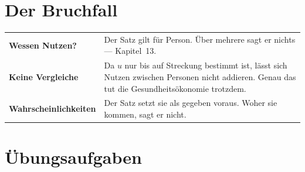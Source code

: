 \section{Der Bruchfall}

\begin{warnung}
\begin{center}
{\small
\renewcommand{\arraystretch}{1.52}
\begin{tabular}{@{}P{3.0cm}P{5.6cm}@{}}
\toprule
\textbf{Wessen Nutzen?} & Der Satz gilt für  Person. Über mehrere sagt er nichts --- Kapitel~13.\\
\textbf{Keine Vergleiche} & Da $u$ nur bis auf Streckung bestimmt ist, lässt sich Nutzen zwischen Personen nicht addieren. Genau das tut die Gesundheitsökonomie trotzdem.\\
\textbf{Wahrschein\-lichkeiten} & Der Satz setzt sie als gegeben voraus. Woher sie kommen, sagt er nicht.\\
\bottomrule
\end{tabular}}
\end{center}

\begin{center}
\begin{minipage}{0.88\textwidth}
\end{minipage}
\end{center}
\end{warnung}

\section{Übungsaufgaben}

